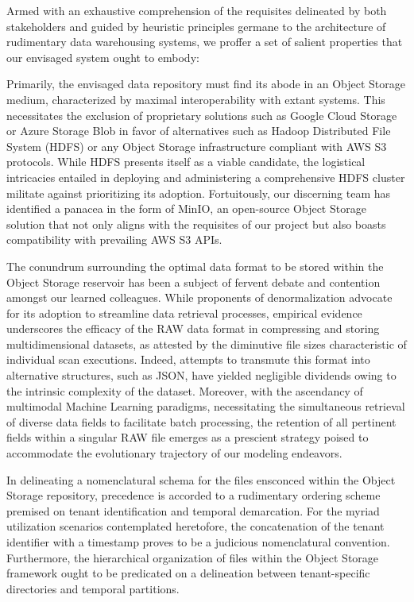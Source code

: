 Armed with an exhaustive comprehension of the requisites delineated by both
stakeholders and guided by heuristic principles germane to the architecture of
rudimentary data warehousing systems, we proffer a set of salient properties
that our envisaged system ought to embody:

Primarily, the envisaged data repository must find its abode in an Object
Storage medium, characterized by maximal interoperability with extant systems.
This necessitates the exclusion of proprietary solutions such as Google Cloud
Storage or Azure Storage Blob in favor of alternatives such as Hadoop
Distributed File System (HDFS) \cite{HDFS} or any Object Storage infrastructure
compliant with AWS S3 protocols. While HDFS presents itself as a viable
candidate, the logistical intricacies entailed in deploying and administering a
comprehensive HDFS cluster militate against prioritizing its adoption.
Fortuitously, our discerning team has identified a panacea in the form of MinIO,
an open-source Object Storage solution that not only aligns with the requisites
of our project but also boasts compatibility with prevailing AWS S3 APIs.

The conundrum surrounding the optimal data format to be stored within the Object
Storage reservoir has been a subject of fervent debate and contention amongst
our learned colleagues. While proponents of denormalization advocate for its
adoption to streamline data retrieval processes, empirical evidence underscores
the efficacy of the RAW data format in compressing and storing multidimensional
datasets, as attested by the diminutive file sizes characteristic of individual
scan executions. Indeed, attempts to transmute this format into alternative
structures, such as JSON, have yielded negligible dividends owing to the
intrinsic complexity of the dataset. Moreover, with the ascendancy of multimodal
Machine Learning paradigms, necessitating the simultaneous retrieval of diverse
data fields to facilitate batch processing, the retention of all pertinent
fields within a singular RAW file emerges as a prescient strategy poised to
accommodate the evolutionary trajectory of our modeling endeavors.

In delineating a nomenclatural schema for the files ensconced within the Object
Storage repository, precedence is accorded to a rudimentary ordering scheme
premised on tenant identification and temporal demarcation. For the myriad
utilization scenarios contemplated heretofore, the concatenation of the tenant
identifier with a timestamp proves to be a judicious nomenclatural convention.
Furthermore, the hierarchical organization of files within the Object Storage
framework ought to be predicated on a delineation between tenant-specific
directories and temporal partitions.

